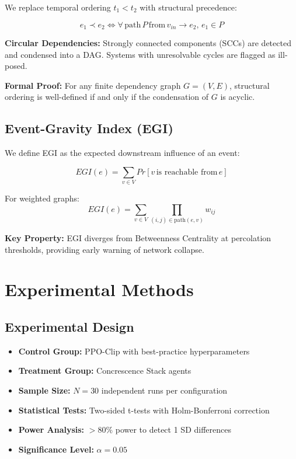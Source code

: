 \documentclass[11pt]{article}
\begin{document}
We replace temporal ordering $t_1 < t_2$ with structural precedence:

\[
e_1 \prec e_2 \iff \forall\,\text{path}\,P\,\text{from}\,v_{in}\rightarrow e_2,\,e_1\in P
\]

\textbf{Circular Dependencies:} Strongly connected components (SCCs) are detected and condensed into a DAG. Systems with unresolvable cycles are flagged as ill-posed.

\textbf{Formal Proof:} For any finite dependency graph $G=(V,E)$, structural ordering is well-defined if and only if the condensation of $G$ is acyclic.

\subsection{Event-Gravity Index (EGI)}

We define EGI as the expected downstream influence of an event:

\[
EGI(e) = \sum_{v\in V} Pr[v\,\text{is reachable from}\,e]
\]

For weighted graphs:
\[
EGI(e) = \sum_{v\in V} \prod_{(i,j)\in \text{path}(e,v)} w_{ij}
\]

\textbf{Key Property:} EGI diverges from Betweenness Centrality at percolation thresholds, providing early warning of network collapse.

\section{Experimental Methods}

\subsection{Experimental Design}

\begin{itemize}
    \item \textbf{Control Group:} PPO-Clip with best-practice hyperparameters
    \item \textbf{Treatment Group:} Concrescence Stack agents
    \item \textbf{Sample Size:} $N=30$ independent runs per configuration
    \item \textbf{Statistical Tests:} Two-sided t-tests with Holm-Bonferroni correction
    \item \textbf{Power Analysis:} $>80\%$ power to detect 1 SD differences
    \item \textbf{Significance Level:} $\alpha = 0.05$
\end{itemize}
\end{document}
